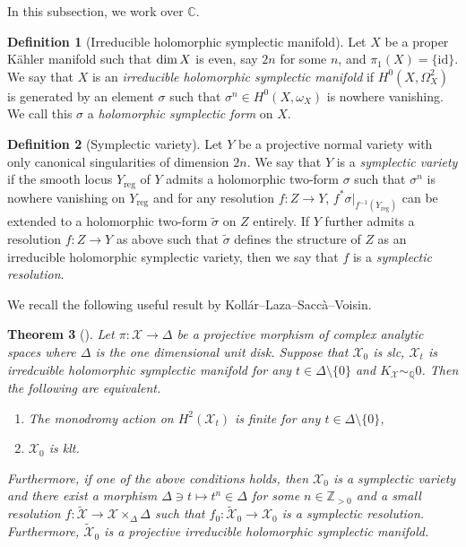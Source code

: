 \documentclass[12pt,twoside]{amsart}
\newtheorem{thm}{Theorem}[section]
\theoremstyle{definition}
\newtheorem{defn}[thm]{Definition}
\begin{document}
In this subsection, we work over $\mathbb{C}$.

\begin{defn}[Irreducible holomorphic symplectic manifold]
    Let $X$ be a proper K\"{a}hler manifold such that ${\rm dim}\,X$ is even, say $2n$ for some $n$, and $\pi_1(X)=\{\mathrm{id}\}$.
    We say that $X$ is an {\it irreducible holomorphic symplectic manifold} if $H^{0}(X,\Omega^2_X)$ is generated by an element $\sigma$ such that $\sigma^n\in H^0(X,\omega_X)$ is nowhere vanishing.
    We call this $\sigma$ a {\it holomorphic symplectic form} on $X$.
\end{defn}

\begin{defn}[Symplectic variety]
    Let $Y$ be a projective normal variety with only canonical singularities of dimension $2n$.
    We say that $Y$ is a {\it symplectic variety} if the smooth locus $Y_{\mathrm{reg}}$ of $Y$ admits a holomorphic two-form $\sigma$ such that $\sigma^n$ is nowhere vanishing on $Y_{\mathrm{reg}}$ and for any resolution $f\colon Z\to Y$, $f^*\sigma|_{f^{-1}(Y_{\mathrm{reg}})}$ can be extended to a holomorphic two-form $\tilde{\sigma}$ on $Z$ entirely. 
If $Y$ further admits a resolution $f\colon Z\to Y$ as above such that $\tilde{\sigma}$ defines the structure of $Z$ as an irreducible holomorphic symplectic variety, then we say that $f$ is a {\it symplectic resolution}.
\end{defn}

We recall the following useful result by Koll\'{a}r--Laza--Sacc\`{a}--Voisin.

\begin{thm}[{\cite[Theorem 3.6, Corollary 5.2]{KLSV}}]\label{thm--klsv}
Let $\pi\colon\mathcal{X}\to \Delta$ be a projective morphism of complex analytic spaces where $\Delta$ is the one dimensional unit disk.
Suppose that $\mathcal{X}_0$ is slc, $\mathcal{X}_t$ is irredcuible holomorphic symplectic manifold for any $t\in\Delta\setminus\{0\}$ and $K_{\mathcal{X}}\sim_{\mathbb{Q}}0$.
Then the following are equivalent.
\begin{enumerate}
    \item The monodromy action on $H^2(\mathcal{X}_t)$ is finite for any $t\in\Delta\setminus\{0\}$,
    \item $\mathcal{X}_0$ is klt.
\end{enumerate}
Furthermore, if one of the above conditions holds, then $\mathcal{X}_0$ is a symplectic variety and there exist a morphism $\Delta\ni t\mapsto t^n\in\Delta$ for some $n\in\mathbb{Z}_{>0}$ and a small resolution $f\colon \widetilde{\mathcal{X}}\to \mathcal{X}\times_\Delta\Delta$ such that $f_{0}\colon \widetilde{\mathcal{X}}_{0}\to \mathcal{X}_0$ is a symplectic resolution.
Furthermore, $\widetilde{\mathcal{X}}_0$ is a projective irreducible holomorphic symplectic manifold.
\end{thm}
\end{document}
